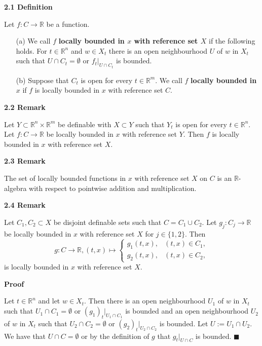 \documentclass[12pt]{article}
\def\vs{\vspace}
\begin{document}
\vs{0.4cm}
{\bf2.1 Definition}

\vs{0.1cm}
Let $f:C \to \mathbb{R}$ be a function.
\begin{itemize}
	\item [(a)] We call $f$ \textbf{locally bounded in $x$ with reference set $X$} if the following holds. For $t \in \mathbb{R}^n$ and $w \in X_t$ there is an open neighbourhood $U$ of $w$ in $X_t$ such that $U \cap C_t = \emptyset$ or $f_t|_{U \cap C_t}$ is bounded. 
	\item [(b)] Suppose that $C_t$ is open for every $t \in \mathbb{R}^m$. We call $f$ \textbf{locally bounded in $x$} if $f$ is locally bounded in $x$ with reference set $C$.	
\end{itemize}

\vs{0.3cm}
{\bf2.2 Remark}

\vs{0.1cm}
Let $Y \subset \mathbb{R}^n \times \mathbb{R}^m$ be definable with $X \subset Y$ such that $Y_t$ is open for every $t \in \mathbb{R}^n$. Let $f:C \to \mathbb{R}$ be locally bounded in $x$ with reference set $Y$. Then $f$ is locally bounded in $x$ with reference set $X$.

\vs{0.5cm}
{\bf2.3 Remark}

\vs{0.1cm}
The set of locally bounded functions in $x$ with reference set $X$ on $C$ is an $\mathbb{R}$-algebra with respect to pointwise addition and multiplication. 

\vs{0.5cm}
{\bf2.4 Remark}

\vs{0.1cm}
Let $C_1,C_2 \subset X$ be disjoint definable sets such that $C = C_1 \cup C_2$. Let $g_j:C_j \to \mathbb{R}$ be locally bounded in $x$ with reference set $X$ for $j \in \{1,2\}$. Then 
$$g:C \to \mathbb{R}, (t,x) \mapsto \left\{\begin{array}{ll} g_1(t,x) , & (t,x) \in C_1,  \\
g_2(t,x), & (t,x) \in C_2, \end{array}\right.$$
is locally bounded in $x$ with reference set $X$.

\vs{0.5cm}
{\bf Proof}

\vs{0.1cm}
Let $t \in \mathbb{R}^n$ and let $w \in X_t$. Then there is an open neighbourhood $U_1$ of $w$ in $X_t$ such that $U_1 \cap C_1=\emptyset$ or $(g_1)_t|_{U_1 \cap C_1}$ is bounded and an open neighbourhood $U_2$ of $w$ in $X_t$ such that $U_2 \cap C_2=\emptyset$ or $(g_2)_t|_{U_2 \cap C_2}$ is bounded. Let $U:=U_1 \cap U_2$. We have that $U \cap C=\emptyset$ or by the definition of $g$ that $g_t|_{U \cap C}$ is bounded. 
\hfill$\blacksquare$
\end{document}
